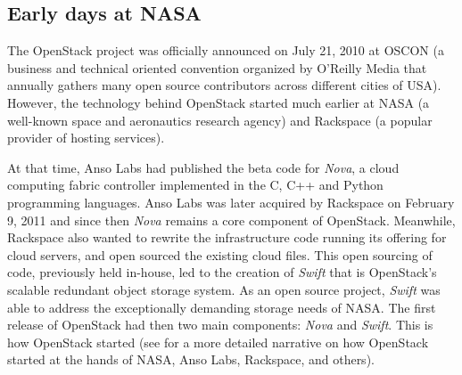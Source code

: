 



\subsection{Early days at NASA}
The OpenStack project was officially announced on July 21, 2010 at OSCON (a business and technical oriented convention organized by O'Reilly Media that annually gathers many open source contributors across different cities of USA). However, the technology behind OpenStack started much earlier at NASA  (a well-known space and aeronautics research agency) and Rackspace (a popular provider of hosting services).

At that time,  Anso Labs had published the beta code for \textit{Nova}, a cloud computing fabric controller implemented in the C, C++ and Python programming languages.  Anso Labs was later acquired by Rackspace on February 9, 2011 and since then \textit{Nova} remains a core component of OpenStack. Meanwhile, Rackspace also wanted to rewrite the infrastructure code running its offering for cloud servers, and open sourced the existing cloud files. This open sourcing of code, previously held in-house,  led to the creation of \textit{Swift} that is OpenStack's scalable redundant object storage system. As an open source project, \textit{Swift} was able to address the exceptionally demanding storage needs of NASA. The first release of OpenStack had then two main components: \textit{Nova} and \textit{Swift}. This is how OpenStack started (see 
\cite{teixeira_and_Hyrynsalmi2017icsob} for a more detailed narrative on how OpenStack started at the hands of  NASA, Anso Labs, Rackspace, and others).

